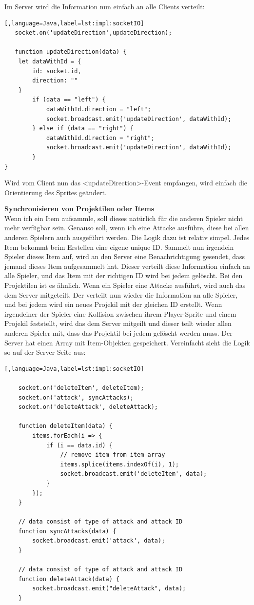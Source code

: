 Im Server wird die Information nun einfach an alle Clients verteilt:

\begin{lstlisting}[,language=Java,label=lst:impl:socketIO]
   socket.on('updateDirection',updateDirection);

   function updateDirection(data) {
    let dataWithId = {
        id: socket.id,
        direction: ""
    }
        if (data == "left") {
            dataWithId.direction = "left";
            socket.broadcast.emit('updateDirection', dataWithId);
        } else if (data == "right") {
            dataWithId.direction = "right";
            socket.broadcast.emit('updateDirection', dataWithId);
        }
}
\end{lstlisting}

Wird vom Client nun das <updateDirection>-Event empfangen, wird einfach die Orientierung des Sprites geändert.

\textbf{Synchronisieren von Projektilen oder Items} \\
Wenn ich ein Item aufsammle, soll dieses natürlich für die anderen Spieler nicht mehr verfügbar sein. Genauso soll, wenn ich eine Attacke ausführe, diese bei allen anderen Spielern auch ausgeführt werden.
Die Logik dazu ist relativ simpel. Jedes Item bekommt beim Erstellen eine eigene unique ID. Sammelt nun irgendein Spieler dieses Item auf, wird an den Server eine Benachrichtigung gesendet, dass jemand dieses Item aufgesammelt hat. 
Dieser verteilt diese Information einfach an alle Spieler, und das Item mit der richtigen ID wird bei jedem gelöscht. 
Bei den Projektilen ist es ähnlich. Wenn ein Spieler eine Attacke ausführt, wird auch das dem Server mitgeteilt. Der verteilt nun wieder die Information an alle Spieler, und bei jedem wird ein neues Projekil mit der gleichen ID erstellt.
Wenn irgendeiner der Spieler eine Kollision zwischen ihrem Player-Sprite und einem Projekil feststellt, wird das dem Server mitgeilt und dieser teilt wieder allen anderen Spieler mit, dass das Projektil bei jedem gelöscht werden muss.
Der Server hat einen Array mit Item-Objekten gespeichert. Vereinfacht sieht die Logik so auf der Server-Seite aus:

\begin{lstlisting}[,language=Java,label=lst:impl:socketIO]

    socket.on('deleteItem', deleteItem);
    socket.on('attack', syncAttacks);
    socket.on('deleteAttack', deleteAttack);

    function deleteItem(data) {
        items.forEach(i => {
            if (i == data.id) {
                // remove item from item array
                items.splice(items.indexOf(i), 1);
                socket.broadcast.emit('deleteItem', data);
            }
        });
    }

    // data consist of type of attack and attack ID
    function syncAttacks(data) {
        socket.broadcast.emit('attack', data);
    }

    // data consist of type of attack and attack ID
    function deleteAttack(data) {
        socket.broadcast.emit("deleteAttack", data);
    }

 \end{lstlisting}


